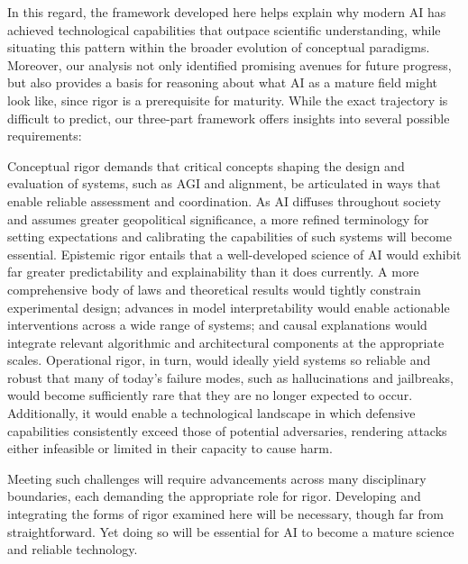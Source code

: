 \documentclass{article}
\begin{document}
In this regard, the framework developed here helps explain why modern AI has achieved technological capabilities that outpace scientific understanding, while situating this pattern within the broader evolution of conceptual paradigms.
Moreover, our analysis not only identified promising avenues for future progress, but also provides a basis for reasoning about what AI as a mature field might look like, since rigor is a prerequisite for maturity.
While the exact trajectory is difficult to predict, our three-part framework offers insights into several possible requirements:

Conceptual rigor demands that critical concepts shaping the design and evaluation of systems, such as AGI and alignment, be articulated in ways that enable reliable assessment and coordination.
As AI diffuses throughout society and assumes greater geopolitical significance, a more refined terminology for setting expectations and calibrating the capabilities of such systems will become essential.
Epistemic rigor entails that a well-developed science of AI would exhibit far greater predictability and explainability than it does currently.
A more comprehensive body of laws and theoretical results would tightly constrain experimental design; advances in model interpretability would enable actionable interventions across a wide range of systems; and causal explanations would integrate relevant algorithmic and architectural components at the appropriate scales.
Operational rigor, in turn, would ideally yield systems so reliable and robust that many of today’s failure modes, such as hallucinations and jailbreaks, would become sufficiently rare that they are no longer expected to occur.
Additionally, it would enable a technological landscape in which defensive capabilities consistently exceed those of potential adversaries, rendering attacks either infeasible or limited in their capacity to cause harm.

Meeting such challenges will require advancements across many disciplinary boundaries, each demanding the appropriate role for rigor.
Developing and integrating the forms of rigor examined here will be necessary, though far from straightforward.
Yet doing so will be essential for AI to become a mature science and reliable technology.





\end{document}
